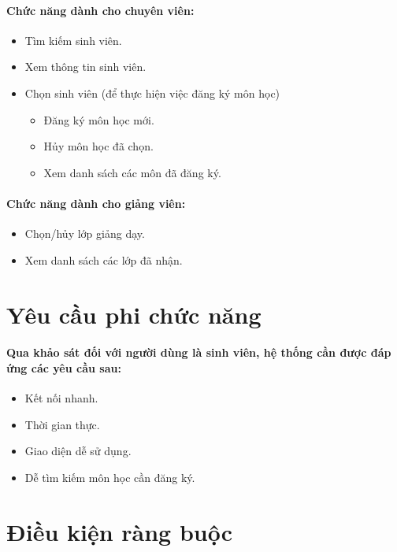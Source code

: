 \documentclass[12pt]{book}
\begin{document}
    \paragraph{Chức năng dành cho chuyên viên:}
    \begin{itemize}
      \item Tìm kiếm sinh viên.
      \item Xem thông tin sinh viên.
      \item Chọn sinh viên (để thực hiện việc đăng ký môn học)
      \begin{itemize}
        \item Đăng ký môn học mới.
        \item Hủy môn học đã chọn.
        \item Xem danh sách các môn đã đăng ký.
      \end{itemize}
    \end{itemize}

    \paragraph{Chức năng dành cho giảng viên:}
    \begin{itemize}
      \item Chọn/hủy lớp giảng dạy.
      \item Xem danh sách các lớp đã nhận.
    \end{itemize}

  \section{Yêu cầu phi chức năng}
    \paragraph{
      \textnormal{
        Qua khảo sát đối với người dùng là sinh viên, hệ thống cần được đáp ứng các yêu cầu sau:
      }
    }
    \begin{itemize}
      \item Kết nối nhanh.
      \item Thời gian thực.
      \item Giao diện dễ sử dụng.
      \item Dễ tìm kiếm môn học cần đăng ký.
    \end{itemize}
  
  \section{Điều kiện ràng buộc}
\end{document}
